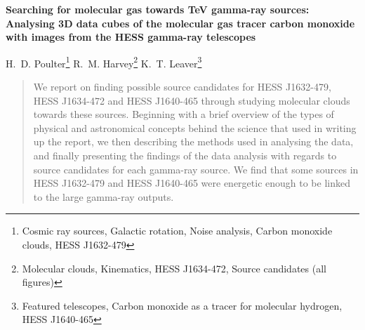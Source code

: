 \documentclass[a4paper, titlepage, oneside]{article}
\begin{document}
\setcounter{page}{1}

\tableofcontents

\clearpage
\setcounter{page}{1}

\begin{center}
  {\large \textbf{Searching for molecular gas towards TeV gamma-ray sources: Analysing 3D data cubes of the molecular gas tracer carbon monoxide with images from the HESS gamma-ray telescopes}}

  \vspace{1.5em}

  H.~D. Poulter\footnote{Cosmic ray sources, Galactic rotation, Noise analysis, Carbon monoxide clouds, HESS J1632-479} \quad R.~M. Harvey\footnote{Molecular clouds, Kinematics, HESS J1634-472, Source candidates (all figures)} \quad K.~T. Leaver\footnote{Featured telescopes, Carbon monoxide as a tracer for molecular hydrogen, HESS J1640-465}
\end{center}

\vspace{1.5em}

\begin{minipage}{0.93\textwidth}
  \begin{abstract}
  We report on finding possible source candidates for HESS J1632-479, HESS J1634-472 and HESS J1640-465 through studying molecular clouds towards these sources. Beginning with a brief overview of the types of physical and astronomical concepts behind the science that  used in writing up the report, we then describing the methods used in analysing the data, and finally presenting the findings of the data analysis with regards to source candidates for each gamma-ray source. We find that some sources in HESS J1632-479 and HESS J1640-465 were energetic enough to be linked to the large gamma-ray outputs.
  \end{abstract}
\end{minipage}

\vspace{1em}
\end{document}
